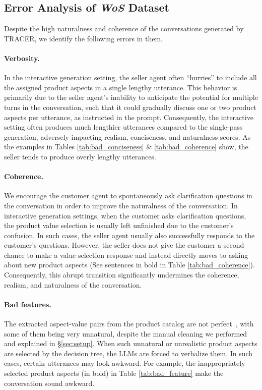\subsection{Error Analysis of \textit{WoS} Dataset} \label{sec:error_analysis}
 Despite the high naturalness and coherence of the conversations generated by TRACER, we identify the following errors in them. 
 
 \paragraph{Verbosity.} In the interactive generation setting, the seller agent often ``hurries'' to include all the assigned product aspects in a single lengthy utterance. This behavior is primarily due to the seller agent's inability to anticipate the potential for multiple turns in the conversation, such that it could gradually discuss one or two product aspects per utterance, as instructed in the prompt. Consequently, the interactive setting often produces much lengthier utterances compared to the single-pass generation, adversely impacting realism, conciseness, and naturalness scores. As the examples in Tables \ref{tab:bad_conciseness} \& \ref{tab:bad_coherence} show, the seller tends to produce overly lengthy utterances.

 \paragraph{Coherence.} We encourage the customer agent to spontaneously ask clarification questions in the conversation in order to improve the naturalness of the conversation. In interactive generation settings, when the customer asks clarification questions, the product value selection is usually left unfinished due to the customer's confusion. In such cases, the seller agent usually also successfully responds to the customer's questions. However, the seller does not give the customer a second chance to make a value selection response and instead directly moves to asking about new product aspects (See sentences in bold in Table \ref{tab:bad_coherence}). Consequently, this abrupt transition significantly undermines the coherence, realism, and naturalness of the conversation.

 \paragraph{Bad features.} The extracted aspect-value pairs from the product catalog are not perfect~\cite{putthividhya2011bootstrapped,raju2009unsupervised,yang2022mave}, with some of them being very unnatural, despite the manual cleaning we performed and explained in \S\ref{sec:setup}. When such unnatural or unrealistic product aspects are selected by the decision tree, the LLMs are forced to verbalize them. In such cases, certain utterances may look awkward. For example, the inappropriately selected product aspects (in bold) in Table \ref{tab:bad_feature} make the conversation sound awkward.

